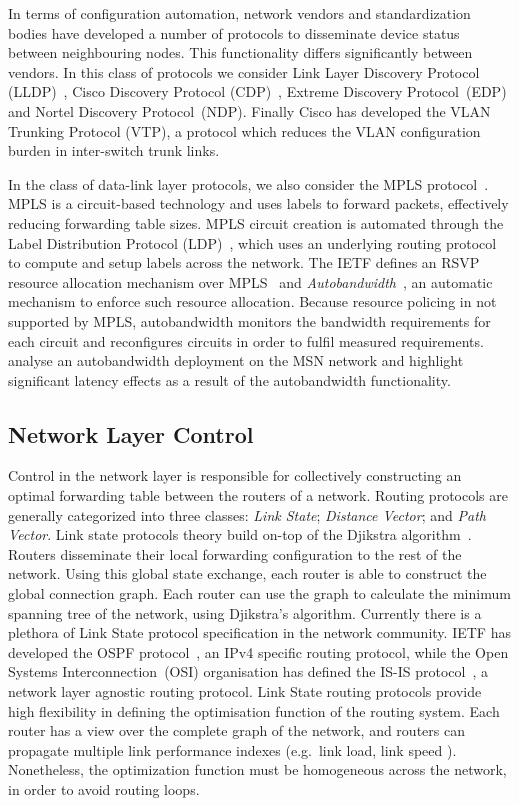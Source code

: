 In terms of configuration automation, network vendors and standardization bodies
have developed a number of protocols to disseminate device status between
neighbouring nodes. This functionality differs significantly between vendors.
In this class of protocols we consider Link Layer Discovery Protocol
(LLDP)~, Cisco Discovery Protocol
(CDP)~,  Extreme Discovery Protocol~(EDP) and Nortel Discovery
Protocol~(NDP). Finally Cisco has developed the VLAN Trunking Protocol (VTP), a
protocol which reduces the VLAN configuration burden in inter-switch trunk
links.

In the class of data-link layer protocols, we also consider the MPLS
protocol~.  MPLS is a circuit-based technology and uses labels
to forward packets, effectively reducing forwarding table sizes.  MPLS circuit
creation is automated through the Label Distribution Protocol
(LDP)~, which uses an underlying routing protocol to compute
and setup labels across the network. The IETF defines an RSVP resource
allocation mechanism over MPLS~ and
\textit{Autobandwidth}~, an automatic mechanism to enforce
such resource allocation.  Because resource policing in not supported by MPLS,
autobandwidth monitors the bandwidth requirements for each circuit and
reconfigures circuits in order to fulfil measured requirements.
 analyse an autobandwidth deployment on the MSN network and
highlight significant latency effects as a result of the autobandwidth
functionality.


\subsection{Network Layer Control}

Control in the network layer is responsible for collectively constructing an optimal
forwarding table between the routers of a network.  Routing protocols are generally
categorized into three classes: \emph{Link State}; \emph{Distance Vector}; and
\emph{Path Vector}. Link state protocols theory build on-top of the Djikstra
algorithm~. Routers disseminate their local forwarding
configuration to the rest of the network.  Using this global state exchange,
each router is able to construct the global connection graph. Each router can
use the graph to calculate the minimum spanning tree of the network, using
Djikstra's algorithm.  Currently there is a plethora of Link State protocol
specification in the network community.  IETF has developed the OSPF
protocol~, an IPv4 specific routing protocol, while the Open
Systems Interconnection~(OSI) organisation has defined the IS-IS
protocol~, a network layer agnostic routing protocol.  Link
State routing protocols provide high flexibility in defining the optimisation
function of the routing system.  Each router has a view over the complete graph of
the network, and routers can propagate multiple link performance indexes
(e.g.~link load, link speed ).  Nonetheless, the optimization function must be
homogeneous across the network, in order to avoid routing loops.

